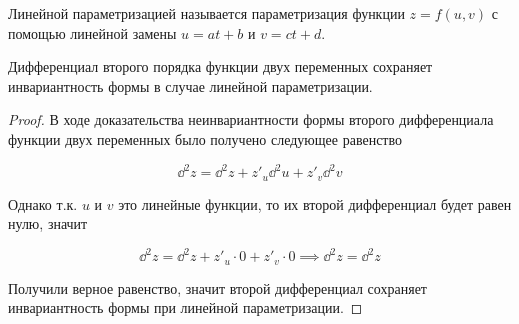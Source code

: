 \begin{definition}
  Линейной параметризацией называется параметризация функции \(z = f(u, v)\) с
  помощью линейной замены \(u = a t + b\) и \(v = ct + d\).
\end{definition}

\begin{theorem}
  Дифференциал второго порядка функции двух переменных сохраняет инвариантность
  формы в случае линейной параметризации.
\end{theorem}

\begin{proof}
  В ходе доказательства неинвариантности формы второго дифференциала функции
  двух переменных было получено следующее равенство

  \begin{equation*}
    \dd^2 z = \dd^2 z + z'_u \dd^2 u + z'_v \dd^2 v 
  \end{equation*}

  Однако т.к. \(u\) и \(v\) это линейные функции, то их второй дифференциал
  будет равен нулю, значит

  \begin{equation*}
    \dd^2 z = \dd^2 z + z'_u \cdot 0 + z'_v \cdot 0 \implies \dd^2 z = \dd^2 z
  \end{equation*}

  Получили верное равенство, значит второй дифференциал сохраняет инвариантность
  формы при линейной параметризации.
\end{proof}
